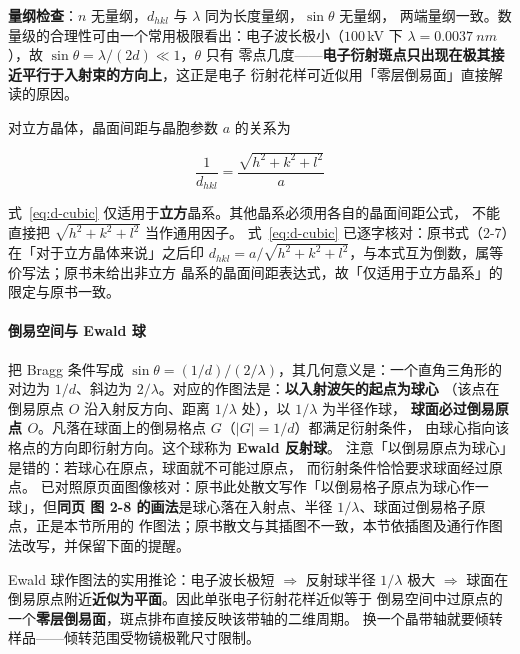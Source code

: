 \textbf{量纲检查}：$n$ 无量纲，$d_{hkl}$ 与 $\lambda$ 同为长度量纲，$\sin\theta$ 无量纲，
两端量纲一致。数量级的合理性可由一个常用极限看出：电子波长极小（$100$\,kV 下
$\lambda=\qty{0.0037}{nm}$），故 $\sin\theta=\lambda/(2d)\ll1$，$\theta$ 只有
零点几度——\textbf{电子衍射斑点只出现在极其接近平行于入射束的方向上}，这正是电子
衍射花样可近似用「零层倒易面」直接解读的原因。

对立方晶体，晶面间距与晶胞参数 $a$ 的关系为

\begin{equation}\label{eq:d-cubic}
\frac{1}{d_{hkl}}=\frac{\sqrt{h^{2}+k^{2}+l^{2}}}{a}
\end{equation}

\begin{keycond}
式~\eqref{eq:d-cubic} 仅适用于\textbf{立方}晶系。其他晶系必须用各自的晶面间距公式，
不能直接把 $\sqrt{h^{2}+k^{2}+l^{2}}$ 当作通用因子。
式~\eqref{eq:d-cubic} 已逐字核对：原书式（2-7）在「对于立方晶体来说」之后印
$d_{hkl}=a/\sqrt{h^{2}+k^{2}+l^{2}}$，与本式互为倒数，属等价写法；原书未给出非立方
晶系的晶面间距表达式，故「仅适用于立方晶系」的限定与原书一致。
\end{keycond}

\paragraph{倒易空间与 Ewald 球}
把 Bragg 条件写成 $\sin\theta=(1/d)\big/(2/\lambda)$，其几何意义是：一个直角三角形的
对边为 $1/d$、斜边为 $2/\lambda$。对应的作图法是：\textbf{以入射波矢的起点为球心}
（该点在倒易原点 $O$ 沿入射反方向、距离 $1/\lambda$ 处），以 $1/\lambda$ 为半径作球，
\textbf{球面必过倒易原点 $O$}。凡落在球面上的倒易格点 $G$（$|G|=1/d$）都满足衍射条件，
由球心指向该格点的方向即衍射方向。这个球称为 \textbf{Ewald 反射球}。
注意「以倒易原点为球心」是错的：若球心在原点，球面就不可能过原点，
而衍射条件恰恰要求球面经过原点。
已对照原页面图像核对：原书此处散文写作「以倒易格子原点为球心作一球」，但\textbf{同页
图 2-8 的画法}是球心落在入射点、半径 $1/\lambda$、球面过倒易格子原点，正是本节所用的
作图法；原书散文与其插图不一致，本节依插图及通行作图法改写，并保留下面的提醒。

\begin{principle}
Ewald 球作图法的实用推论：电子波长极短 $\Rightarrow$ 反射球半径 $1/\lambda$ 极大
$\Rightarrow$ 球面在倒易原点附近\textbf{近似为平面}。因此单张电子衍射花样近似等于
倒易空间中过原点的一个\textbf{零层倒易面}，斑点排布直接反映该带轴的二维周期。
换一个晶带轴就要倾转样品——倾转范围受物镜极靴尺寸限制。
\end{principle}

